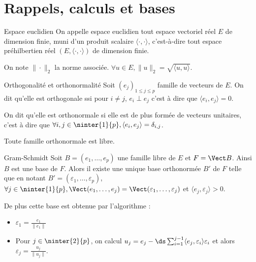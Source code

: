 \section{Rappels, calculs et bases}

\begin{definition}{Espace euclidien}{}
    On appelle espace euclidien tout espace vectoriel réel $E$ de dimension finie,
    muni d'un produit scalaire $\langle \cdot, \cdot \rangle$, c'est-à-dire tout espace 
    préhilbertien réel $(E, \langle \cdot, \cdot \rangle)$ de dimension finie.

    On note $\| \cdot \|_2$ la norme associée. $\forall u \in E, \| u \|_2 = \sqrt{\langle u, u \rangle}$.
\end{definition}

\begin{definition}{Orthogonalité et orthonormalité}{}
    Soit $(e_j)_{1 \leqslant j \leqslant p}$ famille de vecteurs de $E$.
    On dit qu'elle est orthogonale ssi pour $i \neq j$, $e_i \perp e_j$ c'est à dire 
    que $\langle e_i, e_j \rangle = 0$.

    On dit qu'elle est orthonormale si elle est de plus formée de vecteurs unitaires,
    c'est à dire que $\forall i, j \in \ninter{1}{p}, \langle e_i, e_j \rangle = \delta_{i,j}$.

    Toute famille orthonormale est libre. 
\end{definition}

\begin{theoreme}{Gram-Schmidt}{}
    Soit $B = (e_1, \dots, e_p)$ une famille libre de $E$ et $F = \Vect B$. 
    Ainsi $B$ est une base de $F$. Alors il existe une unique base orthonormée 
    $B'$ de $F$ telle que en notant $B' = (\varepsilon_1, \dots, \varepsilon_p)$,
    $\forall j \in \ninter{1}{p}, \Vect(e_1, \dots, e_j) = \Vect(\varepsilon_1, \dots, \varepsilon_j)$
    et $\langle e_j , \varepsilon_j \rangle > 0$.

    De plus cette base est obtenue par l'algorithme : 
    \begin{itemize}
        \item $\varepsilon_1 = \frac{e_1}{\| e_1 \|} $
        \item Pour $j \in \ninter{2}{p}$, on calcul $u_j = e_j - \ds \sum_{i = 1}^{j - 1} \langle e_j, \varepsilon_i \rangle \varepsilon_i$
        et alors $\varepsilon_j = \frac{u_j}{\| u_j \|}$.
    \end{itemize}
\end{theoreme}

